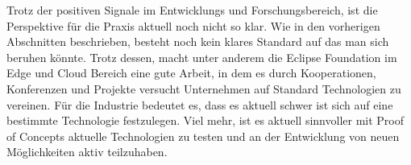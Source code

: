 Trotz der positiven Signale im Entwicklungs und Forschungsbereich, ist die Perspektive für die Praxis aktuell noch nicht so klar. Wie in den vorherigen Abschnitten beschrieben, besteht noch kein klares Standard auf das man sich beruhen könnte. Trotz dessen, macht unter anderem die Eclipse Foundation im Edge und Cloud Bereich eine gute Arbeit, in dem es durch Kooperationen, Konferenzen und Projekte versucht Unternehmen auf Standard Technologien zu vereinen. Für die Industrie bedeutet es, dass es aktuell schwer ist sich auf eine bestimmte Technologie festzulegen. Viel mehr, ist es aktuell sinnvoller mit Proof of Concepts aktuelle Technologien zu testen und an der Entwicklung von neuen Möglichkeiten aktiv teilzuhaben.

